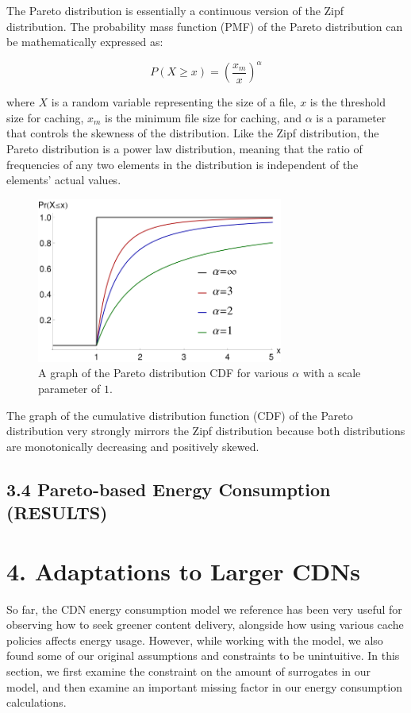 \documentclass[
	a4paper, %
	10pt, %
	unnumberedsections, %
	twoside, %
]{LTJournalArticle}
\begin{document}
The Pareto distribution is essentially a continuous version of the Zipf distribution. The probability mass function (PMF) of the Pareto distribution can be mathematically expressed as:

\[
    P(X \geq x) = \left(\frac{x_m}{x}\right)^\alpha
\]

where $X$ is a random variable representing the size of a file, $x$ is the threshold size for caching, $x_m$ is the minimum file size for caching, and $\alpha$ is a parameter that controls the skewness of the distribution. Like the Zipf distribution, the Pareto distribution is a power law distribution, meaning that the ratio of frequencies of any two elements in the distribution is independent of the elements' actual values.  

\begin{figure}[h]
	\begin{center}
		\includegraphics[width=8.1cm]{pareto.png}
	\end{center}
	\caption{A graph of the Pareto distribution CDF for various $\alpha$ with a scale parameter of $1$.}	
\end{figure}

The graph of the cumulative distribution function (CDF) of the Pareto distribution very strongly mirrors the Zipf distribution because both distributions are monotonically decreasing and positively skewed. 

\subsection{3.4 Pareto-based Energy Consumption (RESULTS)}

\section{4. Adaptations to Larger CDNs}
So far, the CDN energy consumption model we reference has been very useful for observing how to seek greener content delivery, alongside how using various cache policies affects energy usage. However, while working with the model, we also found some of our original assumptions and constraints to be unintuitive. In this section, we first examine the constraint on the amount of surrogates in our model, and then examine an important missing factor in our energy consumption calculations.
\end{document}
